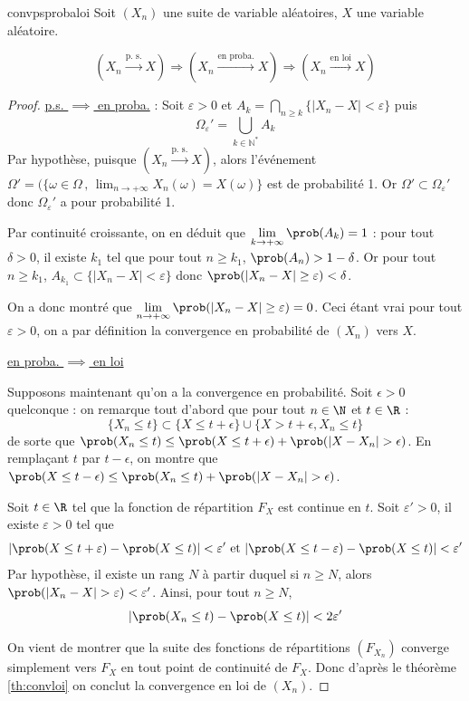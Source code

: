 		
\begin{proposition}{}{convpsprobaloi}
Soit $(X_n)$ une suite de variable aléatoires, $X$ une variable aléatoire. 
			
$$  \left( X_n \xrightarrow[]{\text{p. s.}}X \right)\Longrightarrow \left( X_n \xrightarrow[]{\text{en proba.}}X \right) \Longrightarrow \left( X_n \xrightarrow[]{\text{en loi}}X \right) $$
\end{proposition}
	
		\begin{proof}%
			\underline{p.s. $\implies$ en proba.} : 
		Soit $\varepsilon>0$ et $A_k = \bigcap_{n \geq k} \{|X_n-X|< \varepsilon \}$ puis
		$$\Omega_{\varepsilon}'= \bigcup_{k \in \mathbb{N}^*} A_k$$
		Par hypothèse, puisque $\left( X_n \xrightarrow[]{\text{p. s.}}X \right)$, alors l'événement $\Omega' = (\{\omega \in \Omega \, , \, \lim_{n \to +\infty} X_n(\omega) = X(\omega)\}$ est de probabilité 1. Or $\Omega' \subset \Omega_{\varepsilon}'$ donc $\Omega_{\varepsilon}'$ a pour probabilité 1.
		
		Par continuité croissante, on en déduit que $\lim\limits_{k \to +\infty}\prob(A_k) = 1$ : pour tout $\delta >0$, il existe $k_1$ tel que pour tout $n \geq k_1$, $\prob(A_{n}) > 1-\delta$. Or pour tout  $n \geq k_1$, $A_{k_1} \subset \{|X_n-X|<\varepsilon \}$ donc $\prob(|X_n-X| \geq \varepsilon) < \delta$. 
		
		On a donc montré que $\lim\limits_{n \to +\infty} \prob(|X_n-X| \geq \varepsilon) = 0$. Ceci étant vrai pour tout $\varepsilon >0$, on a par définition la convergence en probabilité de $(X_n)$ vers $X$.
		
		\underline{en proba. $\implies$ en loi}
		
		Supposons maintenant qu'on a la convergence en probabilité. Soit $\epsilon >0$ quelconque : on remarque tout d'abord que pour tout $n \in \N$ et $t \in \R $ :
		$$\{X_n \leq t\} \subset \{ X \leq t+\epsilon \} \cup \{ X>t+\epsilon , X_n \leq t  \}$$
		de sorte que $\prob(X_n \leq t) \leq \prob(X \leq t + \epsilon) + \prob(|X-X_n|> \epsilon)$. En remplaçant $t$ par $t-\epsilon$, on montre que  $\prob(X \leq t-\epsilon) \leq \prob(X_n \leq t) + \prob(|X-X_n|> \epsilon)$. 
		
		Soit $t \in \R$ tel que la fonction de répartition $F_X$ est continue en $t$.  Soit $\varepsilon' >0$, il existe $\varepsilon>0$ tel que 
		$$|\prob(X \leq t + \varepsilon) - \prob(X \leq t)| < \varepsilon' \text{ et } |\prob(X \leq t - \varepsilon) - \prob(X \leq t)| < \varepsilon'$$
		Par hypothèse, il existe un rang $N$ à partir duquel si $n \geq N$, alors $\prob(|X_n-X| > \varepsilon) < \varepsilon'$. Ainsi, pour tout $n \geq N$, $$|\prob(X_n \leq t) - \prob(X \leq t)| < 2\varepsilon'$$
		
		On vient de montrer que la suite des fonctions de répartitions $(F_{X_n})$ converge simplement vers $F_X$ en tout point de continuité de $F_X$. Donc d'après le théorème \ref{th:convloi} on conclut la convergence en loi de $(X_n)$.
		\end{proof}
		
